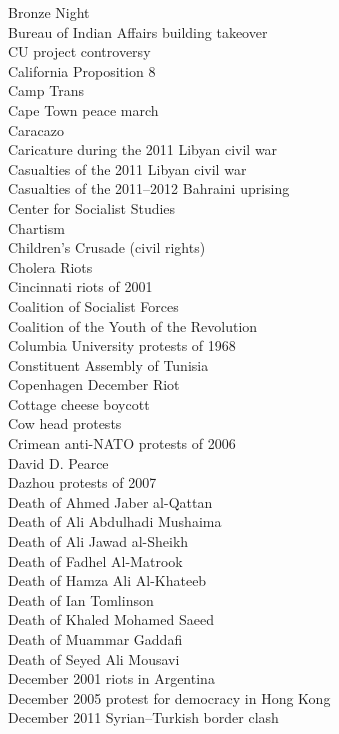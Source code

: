 Bronze Night\\
Bureau of Indian Affairs building takeover\\
CU project controversy\\
California Proposition 8\\
Camp Trans\\
Cape Town peace march\\
Caracazo\\
Caricature during the 2011 Libyan civil war\\
Casualties of the 2011 Libyan civil war\\
Casualties of the 2011–2012 Bahraini uprising\\
Center for Socialist Studies\\
Chartism\\
Children's Crusade (civil rights)\\
Cholera Riots\\
Cincinnati riots of 2001\\
Coalition of Socialist Forces\\
Coalition of the Youth of the Revolution\\
Columbia University protests of 1968\\
Constituent Assembly of Tunisia\\
Copenhagen December Riot\\
Cottage cheese boycott\\
Cow head protests\\
Crimean anti-NATO protests of 2006\\
David D. Pearce\\
Dazhou protests of 2007\\
Death of Ahmed Jaber al-Qattan\\
Death of Ali Abdulhadi Mushaima\\
Death of Ali Jawad al-Sheikh\\
Death of Fadhel Al-Matrook\\
Death of Hamza Ali Al-Khateeb\\
Death of Ian Tomlinson\\
Death of Khaled Mohamed Saeed\\
Death of Muammar Gaddafi\\
Death of Seyed Ali Mousavi\\
December 2001 riots in Argentina\\
December 2005 protest for democracy in Hong Kong\\
December 2011 Syrian–Turkish border clash\\
